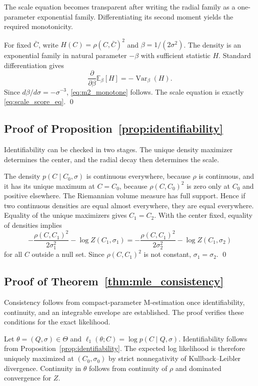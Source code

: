 \documentclass[
  12pt]{article}
\newcommand{\E}{\mathbb E}
\newcommand{\Var}{\operatorname{Var}}
\begin{document}
The scale equation becomes transparent after writing the radial family as a one-parameter exponential family. Differentiating its second moment yields the required monotonicity.

For fixed $\bar C$, write $H(C)=\rho(C,\bar C)^2$ and $\beta=1/(2\sigma^2)$. The density is an exponential family in natural parameter $-\beta$ with sufficient statistic $H$. Standard differentiation gives
\[
\frac{\partial}{\partial \beta}\E_{\beta}[H]=-\Var_{\beta}(H).
\]
Since $d\beta/d\sigma=-\sigma^{-3}$, \eqref{eq:m2_monotone} follows. The scale equation is exactly \eqref{eq:scale_score_eq}. \qed

\subsection{Proof of Proposition~\ref{prop:identifiability}}

Identifiability can be checked in two stages. The unique density maximizer determines the center, and the radial decay then determines the scale.

The density $p(C\mid C_0,\sigma)$ is continuous everywhere, because $\rho$ is continuous, and it has its unique maximum at $C=C_0$, because $\rho(C,C_0)^2$ is zero only at $C_0$ and positive elsewhere. The Riemannian volume measure has full support. Hence if two continuous densities are equal almost everywhere, they are equal everywhere. Equality of the unique maximizers gives $C_1=C_2$. With the center fixed, equality of densities implies
\[
-\frac{\rho(C,C_1)^2}{2\sigma_1^2}-\log Z(C_1,\sigma_1)=-\frac{\rho(C,C_1)^2}{2\sigma_2^2}-\log Z(C_1,\sigma_2)
\]
for all $C$ outside a null set. Since $\rho(C,C_1)^2$ is not constant, $\sigma_1=\sigma_2$. \qed

\subsection{Proof of Theorem~\ref{thm:mle_consistency}}

Consistency follows from compact-parameter M-estimation once identifiability, continuity, and an integrable envelope are established. The proof verifies these conditions for the exact likelihood.

Let $\theta=(Q,\sigma)\in\Theta$ and $\ell_1(\theta;C)=\log p(C\mid Q,\sigma)$. Identifiability follows from Proposition~\ref{prop:identifiability}. The expected log likelihood is therefore uniquely maximized at $(C_0,\sigma_0)$ by strict nonnegativity of Kullback--Leibler divergence. Continuity in $\theta$ follows from continuity of $\rho$ and dominated convergence for $Z$.
\end{document}
